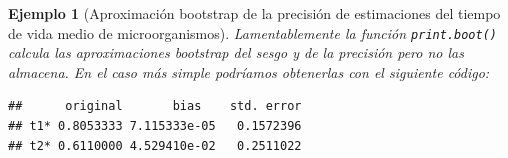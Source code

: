 \documentclass[
]{book}
\newenvironment{Shaded}{\begin{snugshade}}{\end{snugshade}}
\newcommand{\AttributeTok}[1]{\textcolor[rgb]{0.13,0.29,0.53}{#1}}
\newcommand{\ConstantTok}[1]{\textcolor[rgb]{0.56,0.35,0.01}{#1}}
\newcommand{\DecValTok}[1]{\textcolor[rgb]{0.00,0.00,0.81}{#1}}
\newcommand{\FunctionTok}[1]{\textcolor[rgb]{0.13,0.29,0.53}{\textbf{#1}}}
\newcommand{\NormalTok}[1]{#1}
\newcommand{\OtherTok}[1]{\textcolor[rgb]{0.56,0.35,0.01}{#1}}
\newcommand{\SpecialCharTok}[1]{\textcolor[rgb]{0.81,0.36,0.00}{\textbf{#1}}}
\newcommand{\StringTok}[1]{\textcolor[rgb]{0.31,0.60,0.02}{#1}}
\theoremstyle{break}
\newtheorem{example}{Ejemplo}[chapter]
\theoremstyle{nonumberplain}
\begin{document}
\begin{example}[Aproximación bootstrap de la precisión de estimaciones del tiempo de vida medio de microorganismos]
Lamentablemente la función \texttt{print.boot()} calcula las aproximaciones
bootstrap del sesgo y de la precisión pero no las almacena.
En el caso más simple podríamos obtenerlas con el siguiente código:

\begin{Shaded}
\end{Shaded}

\begin{verbatim}
##      original       bias    std. error
## t1* 0.8053333 7.115333e-05   0.1572396
## t2* 0.6110000 4.529410e-02   0.2511022
\end{verbatim}

\end{example}
\end{document}
